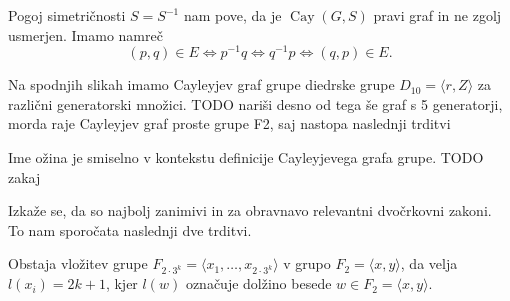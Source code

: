 \documentclass[mat1, tisk]{fmfdelo}
\numberwithin{equation}{section}  %
\begin{document}
\begin{opomba}
Pogoj simetričnosti $S = S^{-1}$ nam pove, da je $\operatorname{Cay}(G, S)$ pravi graf in ne zgolj usmerjen. Imamo namreč \begin{equation*}
(p,q) \in  E \iff p^{-1}q \iff q^{-1}p \iff (q,p) \in  E.
\end{equation*}  
\end{opomba}

\begin{primer}
Na spodnjih slikah imamo Cayleyjev graf grupe diedrske grupe $D_{10} = \langle r, Z \rangle$ za različni generatorski množici.
TODO nariši desno od tega še graf s 5 generatorji, morda raje Cayleyjev graf proste grupe F2, saj nastopa naslednji trditvi
\begin{center}
    \end{center}
\end{primer}


\begin{opomba}
Ime ožina je smiselno v kontekstu definicije Cayleyjevega grafa grupe. TODO zakaj
\end{opomba}


Izkaže se, da so najbolj zanimivi in za obravnavo relevantni dvočrkovni zakoni. To nam sporočata naslednji dve trditvi.
\begin{trditev}
\label{trd_vlozitev_proste_grupe}
 Obstaja vložitev grupe $F_{2 \cdot 3^{k}} = \langle x_1, \ldots, x_{2 \cdot 3^{k}} \rangle$ v grupo $F_2 = \langle x,y \rangle $, da velja $l(x_i) = 2k + 1$, kjer $l(w)$ označuje dolžino besede $w \in F_2 = \langle x,y \rangle$. 
\end{trditev}
\end{document}
